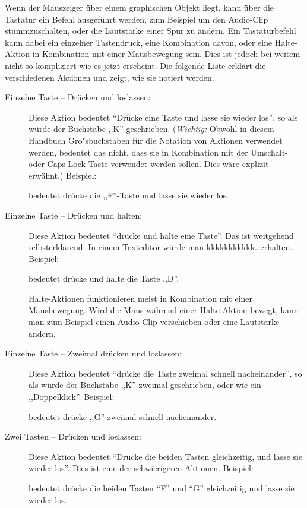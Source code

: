 Wenn der Mauszeiger über einem graphischen Objekt liegt, kann über die Tastatur ein Befehl ausgeführt werden, zum Beispiel um den Audio-Clip stummzuschalten, oder die Lautstärke einer Spur zu ändern. Ein Tastaturbefehl kann dabei ein einzelner Tastendruck, eine Kombination davon, oder eine Halte-Aktion in Kombination mit einer Mausbewegung sein. Dies ist jedoch bei weitem nicht so kompliziert wie es jetzt erscheint. Die folgende Liste erklärt die verschiedenen Aktionen und zeigt, wie sie notiert werden.

\begin{description}
\item[Einzelne Taste  -- Drücken und loslassen:]
Diese Aktion bedeutet ``Drücke eine Taste und lasse sie wieder los'', so als würde der Buchstabe ,,K'' geschrieben. (\emph{Wichtig:} Obwohl in diesem Handbuch Gro"sbuchstaben für die Notation von Aktionen verwendet werden, bedeutet das nicht, dass sie in Kombination mit der Umschalt- oder Caps-Lock-Taste verwendet werden sollen. Dies wäre explizit erwähnt.) Beispiel:
\begin{quotation}
\end{quotation}
bedeutet drücke die ,,F''-Taste und lasse sie wieder los.

\item[Einzelne Taste  -- Drücken und halten:]
Diese Aktion bedeutet ``drücke und halte eine Taste''. Das ist weitgehend selbsterklärend. In einem Texteditor würde man kkkkkkkkkkk\dots erhalten.
Beispiel:
\begin{quotation}
\end{quotation}
bedeutet drücke und halte die Taste ,,D''.

Halte-Aktionen funktionieren meist in Kombination mit einer Mausbewegung. Wird die Maus während einer Halte-Aktion bewegt, kann man zum Beispiel einen Audio-Clip verschieben oder eine Lautstärke ändern.

\item[Einzelne Taste  -- Zweimal drücken und loslassen:]
Diese Aktion bedeutet ``drücke die Taste zweimal schnell nacheinander'', so als würde der Buchstabe ,,K'' zweimal geschrieben, oder wie ein ,,Doppelklick''. Beispiel:
\begin{quotation}
\end{quotation}
bedeutet drücke ,,G'' zweimal schnell nacheinander.

\item[Zwei Tasten  -- Drücken und loslassen:]
Diese Aktion bedeutet ``Drücke die beiden Tasten gleichzeitig, und lasse sie wieder los''. Dies ist eine der schwierigeren Aktionen. Beispiel:
\begin{quotation}
\end{quotation}
bedeutet drücke die beiden Tasten ``F'' und ``G'' gleichzeitig und lasse sie wieder los.


\end{description}
